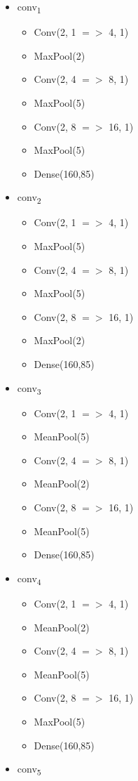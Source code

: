 \documentclass[12pt]{article}
\begin{document}
\begin{itemize}
	\item conv\textsubscript{1} \begin{itemize}
		\item Conv(2, 1 $=>$ 4, 1)
  		\item MaxPool(2)
		\item Conv(2, 4 $=>$ 8, 1)
    	\item MaxPool(5)
		\item Conv(2, 8 $=>$ 16, 1)
		\item MaxPool(5)
  		\item Dense(160,85)
	\end{itemize}
	\item conv\textsubscript{2} \begin{itemize}
		\item Conv(2, 1 $=>$ 4, 1)
  		\item MaxPool(5)
		\item Conv(2, 4 $=>$ 8, 1)
    	\item MaxPool(5)
		\item Conv(2, 8 $=>$ 16, 1)
		\item MaxPool(2)
  		\item Dense(160,85)
	\end{itemize}
	\item conv\textsubscript{3} \begin{itemize}
		\item Conv(2, 1 $=>$ 4, 1)
  		\item MeanPool(5)
		\item Conv(2, 4 $=>$ 8, 1)
    	\item MeanPool(2)
		\item Conv(2, 8 $=>$ 16, 1)
		\item MeanPool(5)
  		\item Dense(160,85)
	\end{itemize}
	\item conv\textsubscript{4} \begin{itemize}
		\item Conv(2, 1 $=>$ 4, 1)
  		\item MeanPool(2)
		\item Conv(2, 4 $=>$ 8, 1)
    	\item MeanPool(5)
		\item Conv(2, 8 $=>$ 16, 1)
		\item MaxPool(5)
  		\item Dense(160,85)
	\end{itemize}
	\item conv\textsubscript{5} \begin{itemize}

\end{itemize}
\end{itemize}
\end{document}
